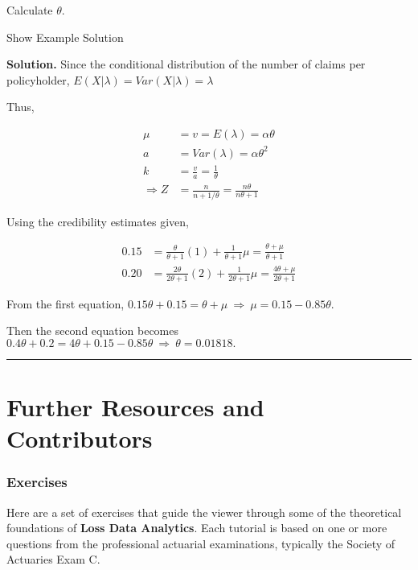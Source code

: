 \documentclass[]{book}
\theoremstyle{definition}
\theoremstyle{definition}
\theoremstyle{definition}
\theoremstyle{remark}
\begin{document}
Calculate \(\theta\).

Show Example Solution

\hypertarget{toggleExampleSelect.4.7}{}
\textbf{Solution.} Since the conditional distribution of the number of
claims per policyholder, \(E(X|\lambda)=Var(X|\lambda)=\lambda\)

Thus,

\[\begin{aligned}
\mu &= v = E(\lambda) = \alpha\theta \\
a &= Var(\lambda) = \alpha\theta^2 \\
k &= \frac{v}{a} = \frac{1}{\theta} \\
\Rightarrow Z &= \frac{n}{n+1/\theta} = \frac{n\theta}{n\theta+1}
\end{aligned}\]

Using the credibility estimates given,

\[\begin{aligned}
0.15 &= \frac{\theta}{\theta + 1}(1) + \frac{1}{\theta + 1}\mu = \frac{\theta + \mu}{\theta + 1} \\
0.20 &= \frac{2\theta}{2\theta+1}(2) + \frac{1}{2\theta+1}\mu = \frac{4\theta+\mu}{2\theta+1}
\end{aligned}\]

From the first equation,
\(0.15\theta + 0.15 = \theta + \mu \ \Rightarrow \ \mu = 0.15- 0.85\theta\).

Then the second equation becomes
\(0.4\theta + 0.2 = 4\theta + 0.15 - 0.85\theta \ \Rightarrow \ \theta=0.01818.\)

\begin{center}\rule{0.5\linewidth}{\linethickness}\end{center}

\section{Further Resources and
Contributors}\label{MS:further-reading-and-resources}

\subsubsection*{Exercises}\label{exercises-2}

Here are a set of exercises that guide the viewer through some of the
theoretical foundations of \textbf{Loss Data Analytics}. Each tutorial
is based on one or more questions from the professional actuarial
examinations, typically the Society of Actuaries Exam C.
\end{document}
